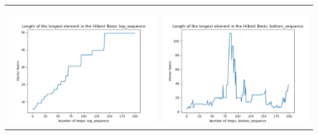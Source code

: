 \documentclass[10pt]{article}
\begin{document}
\begin{tabular}{c|c}
\begin{minipage}{.45\textwidth}
\end{minipage} \\ \\
\hline \\\begin{minipage}{.45\textwidth}
\includegraphics[width=\textwidth]{"DATA/5d/5 generators 2 bound E/top_sequence LENGTH"}
\end{minipage} &
\begin{minipage}{.45\textwidth}
\includegraphics[width=\textwidth]{"DATA/5d/5 generators 2 bound E bottomup/bottom_sequence LENGTH"}
\end{minipage}
\end{tabular}
\end{document}
